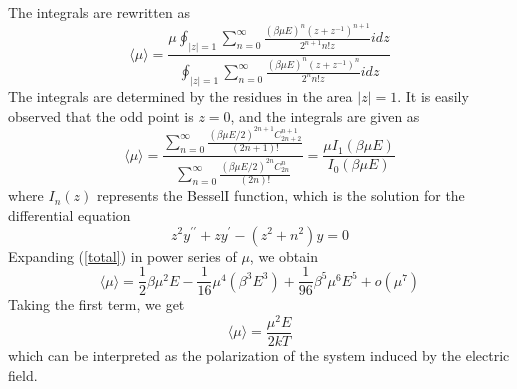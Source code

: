 \documentclass[%
 reprint,
 amsmath,amssymb,
 aps,
10.5pt,
]{revtex4-1}
\begin{document}
The integrals are rewritten as
\begin{equation}
  \langle \mu \rangle = \frac { \mu \oint _ { | z | = 1 } \sum _ { n = 0 } ^ { \infty } \frac { ( \beta \mu E ) ^ { n } \left( z + z ^ { - 1 } \right) ^ { n + 1 } } { 2 ^ { n + 1 } n ! z } i d z } { \oint _ { | z | = 1 } \sum _ { n = 0 } ^ { \infty } \frac { ( \beta \mu E ) ^ { n } \left( z + z ^ { - 1 } \right) ^ { n } } { 2 ^ { n } n ! z } i d z }
\end{equation}
The integrals are determined by the residues in the area
$|z| = 1$. It is easily observed that the odd point is $z = 0$,
and the integrals are given as
\begin{equation}
  \langle \mu \rangle = \frac { \sum _ { n = 0 } ^ { \infty } \frac { ( \beta \mu E / 2 ) ^ { 2 n + 1 } C _ { 2 n + 2 } ^ { n + 1 } } { ( 2 n + 1 ) ! } } { \sum _ { n = 0 } ^ { \infty } \frac { ( \beta \mu E / 2 ) ^ { 2 n } C _ { 2 n } ^ { n } } { ( 2 n ) ! } } = \frac { \mu I _ { 1 } ( \beta \mu E ) } { I _ { 0 } ( \beta \mu E ) }
  \label{total}
\end{equation}
where $I_n(z)$ represents the BesselI function, which is the
solution for the differential equation
\begin{equation}
  z ^ { 2 } y ^ { \prime \prime } + z y ^ { \prime } - \left( z ^ { 2 } + n ^ { 2 } \right) y = 0
\end{equation}
Expanding (\ref{total}) in power series of $\mu$, we obtain
\begin{equation}
  \langle \mu \rangle = \frac { 1 } { 2 } \beta \mu ^ { 2 } E - \frac { 1 } { 16 } \mu ^ { 4 } \left( \beta ^ { 3 } E ^ { 3 } \right) + \frac { 1 } { 96 } \beta ^ { 5 } \mu ^ { 6 } E ^ { 5 } + o \left( \mu ^ { 7 } \right)
\end{equation}
Taking the first term, we get
\begin{equation}
  \langle \mu \rangle = \frac { \mu ^ { 2 } E } { 2 k T }
\end{equation}
which can be interpreted as the polarization of the system
induced by the electric field. 
\end{document}
